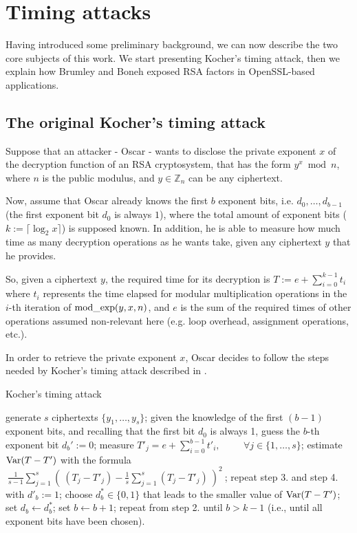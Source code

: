 \section{Timing attacks}

Having introduced some preliminary background, we can now describe the two core subjects of this work. We start presenting Kocher's timing attack, then we explain how Brumley and Boneh exposed RSA factors in OpenSSL-based applications.

\subsection{The original Kocher's timing attack}

Suppose that an attacker - Oscar - wants to disclose the private exponent $x$ of the decryption function of an RSA cryptosystem, that has the form $y^x \bmod n$, where $n$ is the public modulus, and $y \in \mathbb{Z}_n$ can be any ciphertext.

Now, assume that Oscar already knows the first $b$ exponent bits, i.e. $d_0, \dots, d_{b - 1}$ (the first exponent bit $d_0$ is always $1$), where the total amount of exponent bits ($ k := \lceil \log_2x \rceil $) is supposed known.
In addition, he is able to measure how much time as many decryption operations as he wants take, given any ciphertext $y$ that he provides.

So, given a ciphertext $y$, the required time for its decryption is $T := e + \sum_{i=0}^{k-1} t_i$ where $t_i$ represents the time elapsed for modular multiplication operations in the $i$-th iteration of $\operatorname{mod\_exp}(y, x, n)$, and $e$ is the sum of the required times of other operations assumed non-relevant here (e.g. loop overhead, assignment operations, etc.).

In order to retrieve the private exponent $x$, Oscar decides to follow the steps needed by Kocher's timing attack described in .

\begin{algorithm}
\caption{Kocher's timing attack}\label{alg:two}
\begin{algorithmic}[1]
  \State generate $s$ ciphertexts $\{ y_1, \dots, y_s \}$;
  \State given the knowledge of the first $(b - 1)$ exponent bits, and recalling that the first bit $d_0$ is always 1, guess the $b$-th exponent bit $d_b' := 0$;
  \State measure $T'_j = e + \sum_{i = 0}^{b - 1} t'_i, \hspace{1cm} \forall j \in \{ 1, \dots, s\}$;
  \State estimate $\operatorname{Var}(T - T')$ with the formula $\
    \frac{1}{s - 1}\sum_{j = 1}^s \left( \
      (T_j - T'_j) - \frac{1}{s}\sum_{j = 1}^s (T_j - T'_j) \
    \right)^2 \
  $;
  \State repeat step 3. and step 4. with $d'_b := 1$;
  \State choose $d^*_b \in \{0, 1\}$ that leads to the smaller value of $\operatorname{Var}(T - T')$;
  \State set $d_b \leftarrow d^*_b$;
  \State set $b \leftarrow b + 1$;
  \State repeat from step 2. until $b > k - 1$ (i.e., until all exponent bits have been chosen).
\end{algorithmic}
\end{algorithm}

